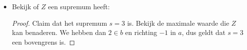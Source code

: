 \documentclass{article}
\newcommand{\f}[2]{\frac{#1}{#2}}
\begin{document}
\begin{enumerate}[label=\arabic*]
\begin{enumerate}[label=\alph*)]
\begin{enumerate}
\begin{itemize}
\begin{proof}
                                                      Stel dat $p$ een ondergrens is en $p > -1$, waarbij we $\epsilon > 0$ nemen dan:
                                                      \begin{align*}
                                                            p - \epsilon & = -1          \\
                                                            p            & = \epsilon -1
                                                      \end{align*}
                                                      Neem $z \in Z$ waarbij $z:= \f{-1 + p}{2}$, dan:
                                                      \begin{align*}
                                                            z & = \f{-1}{2} + \f{p}{2}            \\
                                                              & = \f{-1}{2} + \f{\epsilon - 1}{2} \\
                                                              & = \f{\epsilon}{2} - 1
                                                      \end{align*}
                                                      Hieruit volgt dat $\epsilon - 1 > \f{\epsilon}{2} - 1 > -1$, en dus $p > z > -1$.
                                                      Dit is een tegenspraak want $z \in Z$ en $p > z$ en dus kan $p$ niet een ondergrens zijn.
                                                \end{proof}
                                          \item Bekijk of $Z$ een supremum heeft:
                                                \begin{proof}
                                                      Claim dat het supremum $s = 3$ is. Bekijk de maximale waarde die $Z$ kan benaderen.
                                                      We hebben dan $2 \in b$ en richting $-1$ in $a$, dus geldt dat $s=3$ een bovengrens is.


\end{proof}
\end{itemize}
\end{enumerate}
\end{enumerate}
\end{enumerate}
\end{document}
